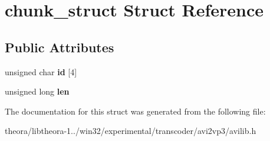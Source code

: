 \hypertarget{structchunk__struct}{\section{chunk\+\_\+struct Struct Reference}
\label{structchunk__struct}
}
\subsection*{Public Attributes}
\begin{DoxyCompactItemize}
\item 
\hypertarget{structchunk__struct_ad863f9420b5a50458b6a7a75a38788e4}{unsigned char {\bfseries id} \mbox{[}4\mbox{]}}\label{structchunk__struct_ad863f9420b5a50458b6a7a75a38788e4}

\item 
\hypertarget{structchunk__struct_ab73a4c810980be8485fa91fe6e752a6d}{unsigned long {\bfseries len}}\label{structchunk__struct_ab73a4c810980be8485fa91fe6e752a6d}

\end{DoxyCompactItemize}


The documentation for this struct was generated from the following file\+:\begin{DoxyCompactItemize}
\item 
theora/libtheora-\/1../win32/experimental/transcoder/avi2vp3/avilib.\+h\end{DoxyCompactItemize}
